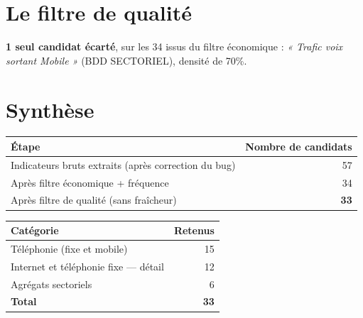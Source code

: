 \documentclass[11pt,a4paper]{article}
\begin{document}
\section{Le filtre de qualité}

\begin{fichebox}
\textbf{1 seul candidat écarté}, sur les 34 issus du filtre économique : \textit{« Trafic voix sortant Mobile »} (BDD SECTORIEL), densité de 70\%.
\end{fichebox}

\section{Synthèse}

\begin{fichebox}
\begin{center}
\begin{tabular}{lr}
\toprule
\textbf{Étape} & \textbf{Nombre de candidats} \\
\midrule
Indicateurs bruts extraits (après correction du bug) & 57 \\
Après filtre économique + fréquence & 34 \\
Après filtre de qualité (sans fraîcheur) & \textbf{33} \\
\bottomrule
\end{tabular}
\end{center}
\end{fichebox}

\begin{center}
\small
\begin{tabular}{lr}
\toprule
\textbf{Catégorie} & \textbf{Retenus} \\
\midrule
Téléphonie (fixe et mobile) & 15 \\
Internet et téléphonie fixe --- détail & 12 \\
Agrégats sectoriels & 6 \\
\midrule
\textbf{Total} & \textbf{33} \\
\bottomrule
\end{tabular}
\end{center}
\end{document}
